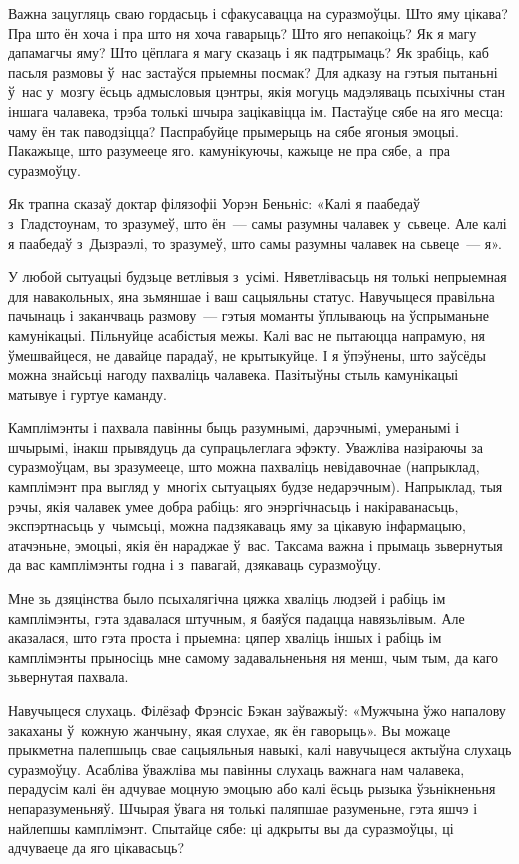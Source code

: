 Важна зацугляць сваю гордасьць і сфакусавацца на суразмоўцы. Што яму цікава? Пра што ён хоча і пра што ня хоча гаварыць? Што яго непакоіць? Як я магу дапамагчы яму? Што цёплага я магу сказаць і як падтрымаць? Як зрабіць, каб пасьля размовы ў~нас застаўся прыемны посмак? Для адказу на гэтыя пытаньні ў~нас у~мозгу ёсьць адмысловыя цэнтры, якія могуць мадэляваць псыхічны стан іншага чалавека, трэба толькі шчыра зацікавіцца ім. Пастаўце сябе на яго месца: чаму ён так паводзіцца? Паспрабуйце прымерыць на сябе ягоныя эмоцыі. Пакажыце, што разумееце яго. камунікуючы, кажыце не пра сябе, а~пра суразмоўцу.

Як трапна сказаў доктар філязофіі Уорэн Беньніс: «Калі я паабедаў з~Гладстоунам, то зразумеў, што ён~--- самы разумны чалавек у~сьвеце. Але калі я паабедаў з~Дызраэлі, то зразумеў, што самы разумны чалавек на сьвеце~--- я».

У любой сытуацыі будзьце ветлівыя з~усімі. Няветлівасьць ня толькі непрыемная для навакольных, яна зьмяншае і ваш сацыяльны статус. Навучыцеся правільна пачынаць і заканчваць размову~--- гэтыя моманты ўплываюць на ўспрыманьне камунікацыі. Пільнуйце асабістыя межы. Калі вас не пытаюцца напрамую, ня ўмешвайцеся, не давайце парадаў, не крытыкуйце. І я ўпэўнены, што заўсёды можна знайсьці нагоду пахваліць чалавека. Пазітыўны стыль камунікацыі матывуе і гуртуе каманду.

Камплімэнты і пахвала павінны быць разумнымі, дарэчнымі, умеранымі і шчырымі, інакш прывядуць да супрацьлеглага эфэкту. Уважліва назіраючы за суразмоўцам, вы зразумееце, што можна пахваліць невідавочнае (напрыклад, камплімэнт пра выгляд у~многіх сытуацыях будзе недарэчным). Напрыклад, тыя рэчы, якія чалавек умее добра рабіць: яго энэргічнасьць і накіраванасьць, экспэртнасьць у~чымсьці, можна падзякаваць яму за цікавую інфармацыю, атачэньне, эмоцыі, якія ён нараджае ў~вас. Таксама важна і прымаць зьвернутыя да вас камплімэнты годна і з~павагай, дзякаваць суразмоўцу.

Мне зь дзяцінства было псыхалягічна цяжка хваліць людзей і рабіць ім камплімэнты, гэта здавалася штучным, я баяўся падацца навязьлівым. Але аказалася, што гэта проста і прыемна: цяпер хваліць іншых і рабіць ім камплімэнты прыносіць мне самому задавальненьня ня менш, чым тым, да каго зьвернутая пахвала.

Навучыцеся слухаць. Філёзаф Фрэнсіс Бэкан заўважыў: «Мужчына ўжо напалову закаханы ў~кожную жанчыну, якая слухае, як ён гаворыць». Вы можаце прыкметна палепшыць свае сацыяльныя навыкі, калі навучыцеся актыўна слухаць суразмоўцу. Асабліва ўважліва мы павінны слухаць важнага нам чалавека, перадусім калі ён адчувае моцную эмоцыю або калі ёсьць рызыка ўзьнікненьня непаразуменьняў. Шчырая ўвага ня толькі паляпшае разуменьне, гэта яшчэ і найлепшы камплімэнт. Спытайце сябе: ці адкрыты вы да суразмоўцы, ці адчуваеце да яго цікавасьць?

